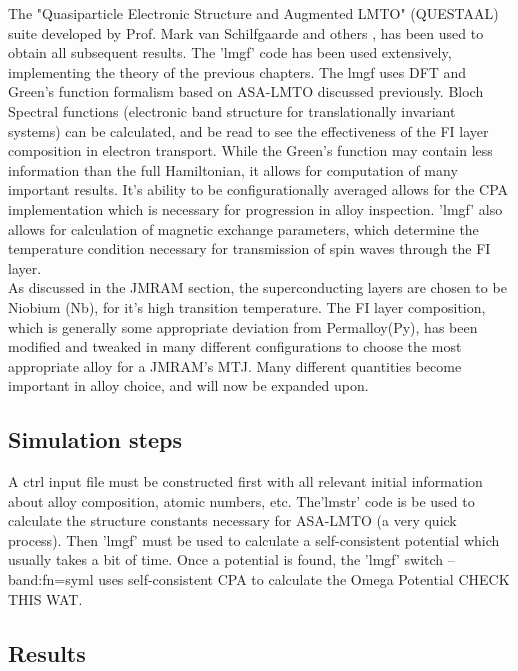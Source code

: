 \documentclass[12pt]{article}
\begin{document}
The "Quasiparticle Electronic Structure and Augmented LMTO" (QUESTAAL) suite developed by Prof. Mark van Schilfgaarde and others \cite{ques}, has been used to obtain all subsequent results. The 'lmgf' code has been used extensively, implementing the theory of the previous chapters. The lmgf uses DFT and Green’s function formalism based on ASA-LMTO discussed previously. Bloch Spectral functions (electronic band structure for translationally invariant systems) can be calculated, and be read to see the effectiveness of the FI layer composition in electron transport. While the Green's function may contain less information than the full Hamiltonian, it allows for computation of many important results. It's ability to be configurationally averaged allows for the CPA implementation which is necessary for progression in alloy inspection. 'lmgf' also allows for calculation of magnetic exchange parameters, which determine the temperature condition necessary for transmission of spin waves through the FI layer. 
\\
As discussed in the JMRAM section, the superconducting layers are chosen to be Niobium (Nb), for it's high transition temperature. The FI layer composition, which is generally some appropriate deviation from Permalloy(Py), has been modified and tweaked in many different configurations to choose the most appropriate alloy for a JMRAM's MTJ. Many different quantities become important in alloy choice, and will now be expanded upon.

\subsection{Simulation steps}

A ctrl input file must be constructed first with all relevant initial information about alloy composition, atomic numbers, etc.
The'lmstr' code is be used to calculate the structure constants necessary for ASA-LMTO (a very quick process). Then 'lmgf' must be used to calculate a self-consistent potential which usually takes a bit of time. Once a potential is found, the 'lmgf' switch --band:fn=syml uses self-consistent CPA to calculate the Omega Potential CHECK THIS WAT. 


\subsection{Results}
\end{document}
